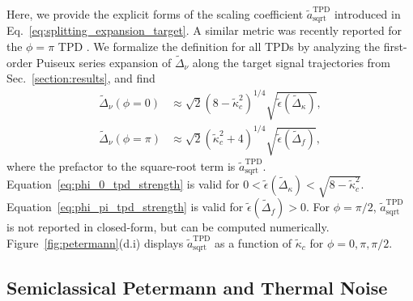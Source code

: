 \documentclass[%
  reprint,
  amsmath,amssymb,
  aps,
  prapplied,
  superscriptaddress,
  longbibliography]{revtex4-2}
\begin{document}
Here, we provide the explicit forms of the scaling coefficient $\tilde{a}_\text{sqrt}^\text{TPD}$ introduced in Eq.~\ref{eq:splitting_expansion_target}. A similar metric was recently reported for the $\phi=\pi$ TPD \cite{kononchuk_exceptional-point-based_2022}. We formalize the definition for all TPDs by analyzing the first-order Puiseux series expansion of $\tilde{\Delta}_\nu$ along the target signal trajectories from Sec.~\ref{section:results}, and find
\begin{align}
\tilde{\Delta}_\nu(\phi = 0) &\approx
\sqrt{2}\left(8-\tilde{\kappa}_{c}^{2}\right)^{1/4}
\sqrt{\tilde{\epsilon}(\tilde{\Delta}_\kappa)},
\label{eq:phi_0_tpd_strength} \\
\tilde{\Delta}_\nu(\phi=\pi) &\approx \sqrt{2}\left( \tilde{\kappa}_c^2 + 4
\right)^{1/4} 
\sqrt{\tilde{\epsilon}(\tilde{\Delta}_f)} , 
\label{eq:phi_pi_tpd_strength}
\end{align}
where the prefactor to the square-root term is $\tilde{a}_{\text{sqrt}}^\text{TPD}$. Equation~\ref{eq:phi_0_tpd_strength} is valid for $0 < \tilde{\epsilon}(\tilde{\Delta}_\kappa) < \sqrt{8 - \tilde{\kappa}_c^2}$. Equation~\ref{eq:phi_pi_tpd_strength} is valid for $\tilde{\epsilon}(\tilde{\Delta}_f)>0$. For $\phi = \pi/2$, $\tilde{a}_{\text{sqrt}}^\text{TPD}$ is not reported in closed-form, but can be computed numerically. Figure~\ref{fig:petermann}(d.i) displays $\tilde{a}_{\text{sqrt}}^\text{TPD}$ as a function of $\tilde{\kappa}_c$ for $\phi = 0, \pi, \pi/2$. 

\subsection{\label{subsec:additive_noise}Semiclassical Petermann and Thermal Noise}
\end{document}
